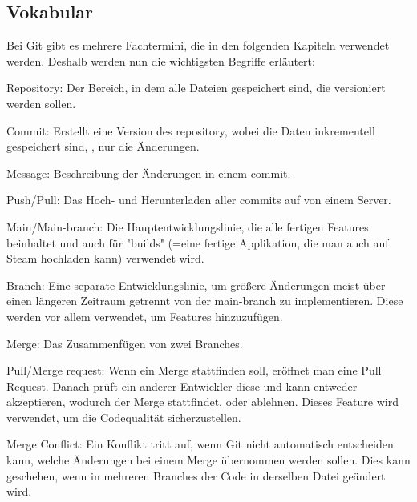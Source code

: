\renewcommand{\kapitelautor}{Autor: Felix Zwickelstorfer}
\subsection{Vokabular}\label{subsec:git-vokabular}


\renewcommand{\kapitelautor}{Autor: Felix Zwickelstorfer}

Bei Git gibt es mehrere Fachtermini, die in den folgenden Kapiteln verwendet werden.
Deshalb werden nun die wichtigsten Begriffe erläutert:

\begin{liste}
    \item Repository: Der Bereich, in dem alle Dateien gespeichert sind, die versioniert werden sollen.
    \item Commit: Erstellt eine Version des repository, wobei die Daten inkrementell gespeichert sind, \dah, nur die Änderungen.
    \item Message: Beschreibung der Änderungen in einem commit.
    \item Push/Pull: Das Hoch- und Herunterladen aller commits auf \bzw von einem Server.
    \item Main/Main-branch: Die Hauptentwicklungslinie, die alle fertigen Features beinhaltet und auch für "builds" (=eine fertige Applikation, die man auch auf Steam hochladen kann) verwendet wird.
    \item Branch: Eine separate Entwicklungslinie, um größere Änderungen meist über einen längeren Zeitraum getrennt von der main-branch zu implementieren.
    Diese werden vor allem verwendet, um Features hinzuzufügen.
    \item Merge: Das Zusammenfügen von zwei Branches.
    \item Pull/Merge request: Wenn ein Merge stattfinden soll, eröffnet man eine Pull Request.
    Danach prüft ein anderer Entwickler diese und kann entweder akzeptieren, wodurch der Merge stattfindet, oder ablehnen.
    Dieses Feature wird verwendet, um die Codequalität sicherzustellen.
    \item Merge Conflict: Ein Konflikt tritt auf, wenn Git nicht automatisch entscheiden kann, welche Änderungen bei einem Merge übernommen werden sollen.
    Dies kann geschehen, wenn in mehreren Branches der Code in derselben Datei geändert wird.\cite{gitHomePage}
\end{liste}
